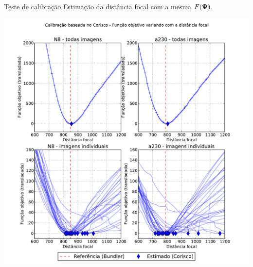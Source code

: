 \begin{frame}{Teste de calibração}
 Estimação da distância focal com a mesma $F({\boldsymbol{\Psi}})$.
\centerline{
    \includegraphics[height=12\baselineskip]{edgel_cali.pdf}
  }
\end{frame}

















